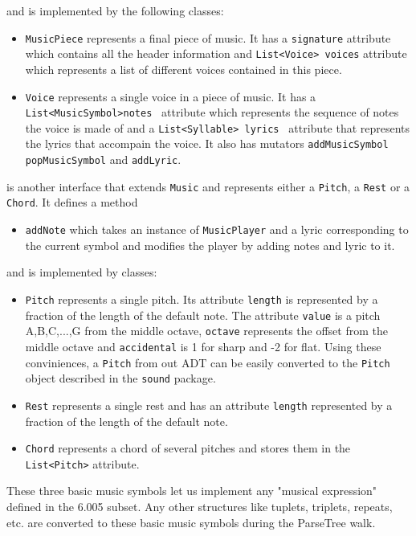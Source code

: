 \documentclass[12pt]{book}
\begin{document}
\noindent and is implemented by the following classes:
\begin{itemize} 
\item { \tt MusicPiece} represents a final piece of music.   It has a {\tt signature} attribute which contains all the header information and {\tt List<Voice> voices} attribute which represents a list of different voices contained in this piece.
\item {\tt Voice}  represents a single voice in a piece of music. It has a {\tt List<MusicSymbol>notes } attribute which represents the sequence of notes the voice is made of and a  {\tt List<Syllable> lyrics } attribute that represents the lyrics that accompain the voice. It also has mutators {\tt addMusicSymbol} {\tt popMusicSymbol} and {\tt addLyric}.
\end{itemize}

\bigskip

 is another interface that extends {\tt Music} and represents either a {\tt Pitch}, a {\tt Rest} or a {\tt Chord}. It defines a method
\begin{itemize} 
\item { \tt addNote} which takes an instance of  {\tt MusicPlayer} and a lyric corresponding to the current symbol and modifies the player by adding notes and lyric to it. 
\end{itemize}
\noindent and is implemented by classes:
\begin{itemize} 
\item { \tt Pitch} represents a single pitch. Its attribute {\tt length} is represented by a fraction  of the length of the default note. The attribute {\tt value} is a pitch A,B,C,...,G from the middle octave,  {\tt octave} represents the offset from the middle octave and  {\tt accidental} is 1 for sharp and -2 for flat. Using these conviniences,  a {\tt Pitch} from out ADT can be easily converted to the {\tt Pitch} object described in the {\tt sound} package.
\item { \tt Rest} represents a single rest and has an attribute {\tt length}  represented by a fraction of the length of the default note. 
\item {\tt Chord} represents a chord of several pitches and stores them in the {\tt List<Pitch>} attribute.
\end{itemize}

These three basic music symbols let us implement any "musical expression" defined in the 6.005 subset. Any other structures like tuplets, triplets, repeats, etc. are converted to these basic music symbols during the ParseTree walk.  
\end{document}
